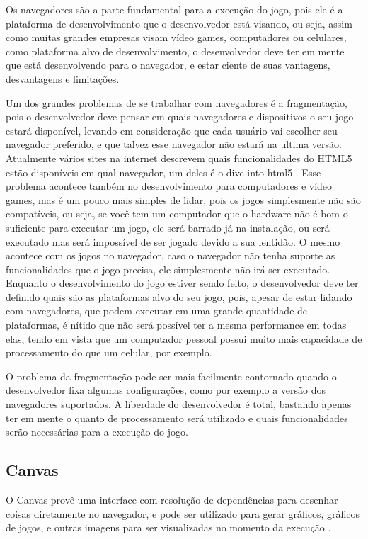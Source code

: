 Os navegadores são a parte fundamental para a execução do jogo, pois
ele é a plataforma de desenvolvimento que o desenvolvedor está visando,
ou seja, assim como muitas grandes empresas visam vídeo games,
computadores ou celulares, como plataforma alvo de desenvolvimento, o
desenvolvedor deve ter em mente que está desenvolvendo para o
navegador, e estar ciente de suas vantagens, desvantagens e
limitações.

Um dos grandes problemas de se trabalhar com navegadores é a
fragmentação, pois o desenvolvedor deve pensar em quais navegadores e
dispositivos o seu jogo estará disponível, levando em consideração
que cada usuário vai escolher seu navegador preferido, e que talvez
esse navegador não estará na ultima versão. Atualmente vários sites na
internet descrevem quais funcionalidades do HTML5 estão disponíveis em
qual navegador, um deles é o dive into html5 \cite{website:diveintohtml5}.
Esse problema acontece também no desenvolvimento para computadores e
vídeo games, mas é um pouco mais simples de lidar, pois os jogos
simplesmente não são compatíveis, ou seja, se você tem um computador
que o hardware não é bom o suficiente para executar um jogo, ele será
barrado já na instalação, ou será executado mas será impossível de ser
jogado devido a sua lentidão. O mesmo acontece com os jogos no
navegador, caso o navegador não tenha suporte as funcionalidades que o
jogo precisa, ele simplesmente não irá ser executado. Enquanto o
desenvolvimento do jogo estiver sendo feito, o desenvolvedor deve ter
definido quais são as plataformas alvo do seu jogo, pois, apesar de
estar lidando com navegadores, que podem executar em uma grande
quantidade de plataformas, é nítido que não será possível ter a mesma
performance em todas elas, tendo em vista que um computador pessoal
possui muito mais capacidade de processamento do que um celular, por
exemplo.

O problema da fragmentação pode ser mais facilmente contornado quando
o desenvolvedor fixa algumas configurações, como por exemplo a versão
dos navegadores suportados. A liberdade do desenvolvedor é total,
bastando apenas ter em mente o quanto de processamento será utilizado
e quais funcionalidades serão necessárias para a execução do jogo.

\subsection{Canvas}

O Canvas provê uma interface com resolução de dependências para
desenhar coisas diretamente no navegador, e pode ser utilizado para
gerar gráficos, gráficos de jogos, e outras imagens para ser
visualizadas no momento da execução \cite{website:w3ccanvas}.

